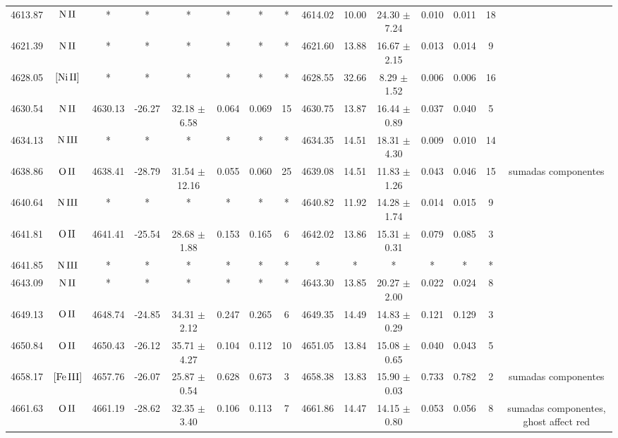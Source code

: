 \documentclass{article}
\begin{document}
\begin{table*}
\begin{adjustbox}{width=\textwidth}
\begin{tabular}{ccccccccccccccc}
4613.87 & $\mbox{N}\thinspace \mbox{II}$ & * & * & * & * & * & * & 4614.02 & 10.00 & 24.30 $\pm$ 7.24 & 0.010 & 0.011 & 18 &  \\
4621.39 & $\mbox{N}\thinspace \mbox{II}$ & * & * & * & * & * & * & 4621.60 & 13.88 & 16.67 $\pm$ 2.15 & 0.013 & 0.014 & 9 &  \\
4628.05 & $\mbox{[Ni}\thinspace \mbox{II]}$ & * & * & * & * & * & * & 4628.55 & 32.66 & 8.29 $\pm$ 1.52 & 0.006 & 0.006 & 16 &  \\
4630.54 & $\mbox{N}\thinspace \mbox{II}$ & 4630.13 & -26.27 & 32.18 $\pm$ 6.58 & 0.064 & 0.069 & 15 & 4630.75 & 13.87 & 16.44 $\pm$ 0.89 & 0.037 & 0.040 & 5 &  \\
4634.13 & $\mbox{N}\thinspace \mbox{III}$ & * & * & * & * & * & * & 4634.35 & 14.51 & 18.31 $\pm$ 4.30 & 0.009 & 0.010 & 14 &  \\
4638.86 & $\mbox{O}\thinspace \mbox{II}$ & 4638.41 & -28.79 & 31.54 $\pm$ 12.16 & 0.055 & 0.060 & 25 & 4639.08 & 14.51 & 11.83 $\pm$ 1.26 & 0.043 & 0.046 & 15 &  sumadas componentes \\
4640.64 & $\mbox{N}\thinspace \mbox{III}$ & * & * & * & * & * & * & 4640.82 & 11.92 & 14.28 $\pm$ 1.74 & 0.014 & 0.015 & 9 &  \\
4641.81 & $\mbox{O}\thinspace \mbox{II}$ & 4641.41 & -25.54 & 28.68 $\pm$ 1.88 & 0.153 & 0.165 & 6 & 4642.02 & 13.86 & 15.31 $\pm$ 0.31 & 0.079 & 0.085 & 3 &  \\
4641.85 & $\mbox{N}\thinspace \mbox{III}$ & * & * & * & * & * & * & * & * & * & * & * & * &  \\
4643.09 & $\mbox{N}\thinspace \mbox{II}$ & * & * & * & * & * & * & 4643.30 & 13.85 & 20.27 $\pm$ 2.00 & 0.022 & 0.024 & 8 &  \\
4649.13 & $\mbox{O}\thinspace \mbox{II}$ & 4648.74 & -24.85 & 34.31 $\pm$ 2.12 & 0.247 & 0.265 & 6 & 4649.35 & 14.49 & 14.83 $\pm$ 0.29 & 0.121 & 0.129 & 3 &  \\
4650.84 & $\mbox{O}\thinspace \mbox{II}$ & 4650.43 & -26.12 & 35.71 $\pm$ 4.27 & 0.104 & 0.112 & 10 & 4651.05 & 13.84 & 15.08 $\pm$ 0.65 & 0.040 & 0.043 & 5 &  \\
4658.17 & $\mbox{[Fe}\thinspace \mbox{III]}$ & 4657.76 & -26.07 & 25.87 $\pm$ 0.54 & 0.628 & 0.673 & 3 & 4658.38 & 13.83 & 15.90 $\pm$ 0.03 & 0.733 & 0.782 & 2 &  sumadas componentes \\
4661.63 & $\mbox{O}\thinspace \mbox{II}$ & 4661.19 & -28.62 & 32.35 $\pm$ 3.40 & 0.106 & 0.113 & 7 & 4661.86 & 14.47 & 14.15 $\pm$ 0.80 & 0.053 & 0.056 & 8 &  sumadas componentes, ghost affect red \\

\end{tabular}
\end{adjustbox}
\end{table*}
\end{document}
